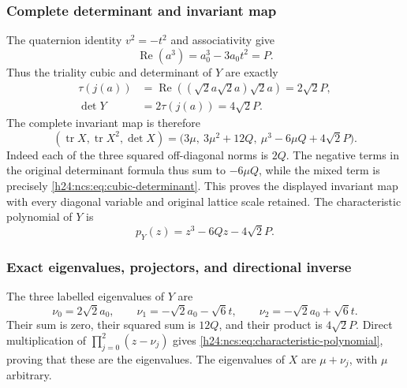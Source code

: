 \subsubsection{Complete determinant and invariant map}
\label{h24:ncs:sec:invariant-map}

The quaternion identity $v^2=-t^2$ and associativity give
\[
 \operatorname{Re}(a^3)=a_0^3-3a_0t^2=P.
\]
Thus the triality cubic and determinant of $Y$ are exactly
\begin{equation}
 \begin{aligned}
 \tau(j(a))
 &=\operatorname{Re}((\sqrt2a\sqrt2a)\sqrt2a)=2\sqrt2P,\\
 \det Y&=2\tau(j(a))=4\sqrt2P.
 \end{aligned}
 \label{h24:ncs:eq:cubic-determinant}\tag{NCS6}
\end{equation}
The complete invariant map is therefore
\begin{equation}
 \boxed{
 (\operatorname{tr}X,\operatorname{tr}X^2,\det X)
   =\bigl(3\mu,\ 3\mu^2+12Q,\
                     \mu^3-6\mu Q+4\sqrt2P\bigr).
 }
 \label{h24:ncs:eq:full-invariants}\tag{NCS7}
\end{equation}
Indeed each of the three squared off-diagonal norms is $2Q$.
The negative terms in the original determinant formula thus sum
to $-6\mu Q$, while the mixed term is precisely
\eqref{h24:ncs:eq:cubic-determinant}. This proves the displayed
invariant map with every diagonal variable and original lattice
scale retained. The characteristic polynomial of $Y$ is
\begin{equation}
 p_Y(z)=z^3-6Qz-4\sqrt2P.
 \label{h24:ncs:eq:characteristic-polynomial}\tag{NCS8}
\end{equation}

\subsubsection{Exact eigenvalues, projectors, and directional inverse}
\label{h24:ncs:sec:projectors}

The three labelled eigenvalues of $Y$ are
\begin{equation}
 \nu_0=2\sqrt2a_0,\qquad
 \nu_1=-\sqrt2a_0-\sqrt6t,\qquad
 \nu_2=-\sqrt2a_0+\sqrt6t.
 \label{h24:ncs:eq:labelled-eigenvalues}\tag{NCS9}
\end{equation}
Their sum is zero, their squared sum is $12Q$, and their product
is $4\sqrt2P$. Direct multiplication of
$\prod_{j=0}^2(z-\nu_j)$ gives
\eqref{h24:ncs:eq:characteristic-polynomial}, proving that these are
the eigenvalues. The eigenvalues of $X$ are $\mu+\nu_j$, with
$\mu$ arbitrary.

